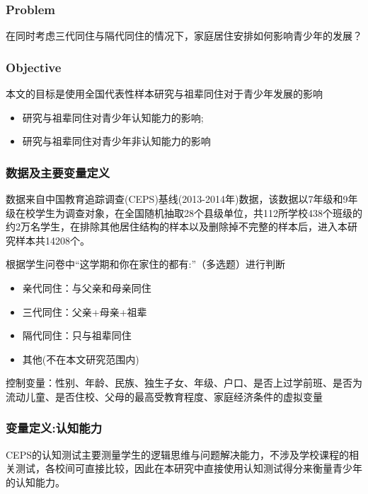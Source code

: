 \documentclass{beamer}
\begin{document}
\begin{frame}
	\frametitle{Problem}
	在同时考虑三代同住与隔代同住的情况下，家庭居住安排如何影响青少年的发展？
\end{frame}

\begin{frame}
	\frametitle{Objective}
本文的目标是使用全国代表性样本研究与祖辈同住对于青少年发展的影响
	\begin{itemize}
		\item 研究与祖辈同住对青少年认知能力的影响;
		\item 研究与祖辈同住对青少年非认知能力的影响
	\end{itemize}
\end{frame}


\begin{frame}
	\frametitle{数据及主要变量定义}
数据来自中国教育追踪调查(CEPS)基线(2013-2014年)数据，该数据以7年级和9年级在校学生为调查对象，在全国随机抽取28个县级单位，共112所学校438个班级的约2万名学生，在排除其他居住结构的样本以及删除掉不完整的样本后，进入本研究样本共14208个。
\par 根据学生问卷中“这学期和你在家住的都有:”（多选题）进行判断
	\begin{itemize}
		\item 亲代同住：与父亲和母亲同住\citep{brown_marriage_2010,liang_2017}
		\item 三代同住：父亲+母亲+祖辈
		\item 隔代同住：只与祖辈同住
		\item 其他(不在本文研究范围内)
	\end{itemize}
\par 控制变量：性别、年龄、民族、独生子女、年级、户口、是否上过学前班、是否为流动儿童、是否住校、父母的最高受教育程度、家庭经济条件的虚拟变量
\end{frame}



\begin{frame}
	\frametitle{变量定义:认知能力}
CEPS的认知测试主要测量学生的逻辑思维与问题解决能力，不涉及学校课程的相关测试，各校间可直接比较，因此在本研究中直接使用认知测试得分来衡量青少年的认知能力。
\end{frame}
\end{document}
